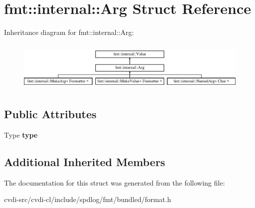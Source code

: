 \hypertarget{structfmt_1_1internal_1_1Arg}{}\section{fmt\+:\+:internal\+:\+:Arg Struct Reference}
\label{structfmt_1_1internal_1_1Arg}
Inheritance diagram for fmt\+:\+:internal\+:\+:Arg\+:\begin{figure}[H]
\begin{center}
\leavevmode
\includegraphics[height=2.413793cm]{structfmt_1_1internal_1_1Arg}
\end{center}
\end{figure}
\subsection*{Public Attributes}
\begin{DoxyCompactItemize}
\item 
Type {\bfseries type}\hypertarget{structfmt_1_1internal_1_1Arg_af1165b4e8647bea5913922de82599e2e}{}\label{structfmt_1_1internal_1_1Arg_af1165b4e8647bea5913922de82599e2e}

\end{DoxyCompactItemize}
\subsection*{Additional Inherited Members}


The documentation for this struct was generated from the following file\+:\begin{DoxyCompactItemize}
\item 
cvdi-\/src/cvdi-\/cl/include/spdlog/fmt/bundled/format.\+h\end{DoxyCompactItemize}
